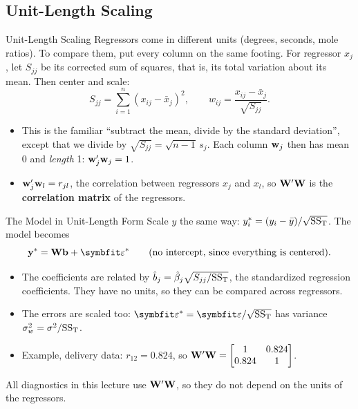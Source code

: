 \subsection{Unit-Length Scaling}


\begin{frame}{Unit-Length Scaling}
    Regressors come in different units (degrees, seconds, mole ratios). To compare them, put every column on the same footing. For regressor $x_j$, let $S_{jj}$ be its corrected sum of squares, that is, its total variation about its mean. Then center and scale:
    \[
    S_{jj}=\sum_{i=1}^n(x_{ij}-\bar x_j)^2,
    \qquad
    w_{ij}=\frac{x_{ij}-\bar x_j}{\sqrt{S_{jj}}} .
    \]
    \begin{itemize}
        \item This is the familiar ``subtract the mean, divide by the standard deviation'', except that we divide by $\sqrt{S_{jj}}=\sqrt{n-1}\,s_j$. Each column $\mathbf{w}_j$ then has mean $0$ and \emph{length} 1: $\mathbf{w}_j'\mathbf{w}_j=1$.
        \item $\mathbf{w}_j'\mathbf{w}_l=r_{jl}$, the correlation between regressors $x_j$ and $x_l$, so $\mathbf{W}'\mathbf{W}$ is the \textbf{correlation matrix} of the regressors.
    \end{itemize}
\end{frame}


\begin{frame}{The Model in Unit-Length Form}
    Scale $y$ the same way: $y_i^*=(y_i-\bar y)/\sqrt{\mathrm{SS}_{\mathrm{T}}}$. The model becomes
    \[
    \by^*=\bW\bb+\bvarepsilon^*\qquad\text{(no intercept, since everything is centered).}
    \]
    \begin{itemize}
        \item The coefficients are related by $\hat b_j=\hat\beta_j\sqrt{S_{jj}/\mathrm{SS}_{\mathrm{T}}}$, the standardized regression coefficients. They have no units, so they can be compared across regressors.
        \item The errors are scaled too: $\bvarepsilon^*=\bvarepsilon/\sqrt{\SST}$ has variance $\sigma_w^2=\sigma^2/\mathrm{SS}_{\mathrm{T}}$.
        \item Example, delivery data: $r_{12}=0.824$, so $\mathbf{W}'\mathbf{W}=\begin{bmatrix}1&0.824\\0.824&1\end{bmatrix}$.
    \end{itemize}
    All diagnostics in this lecture use $\mathbf{W}'\mathbf{W}$, so they do not depend on the units of the regressors.
\end{frame}


